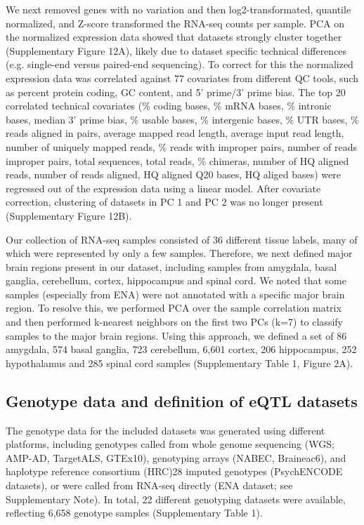 We next removed genes with no variation and then log2-transformated, quantile normalized, and Z-score transformed the RNA-seq counts per sample. PCA on the normalized expression data showed that datasets strongly cluster together (Supplementary Figure 12A), likely due to dataset specific technical differences (e.g. single-end versus paired-end sequencing). To correct for this the normalized expression data was correlated against 77 covariates from different QC tools, such as percent protein coding, GC content, and 5’ prime/3’ prime bias. The top 20 correlated technical covariates (\% coding bases, \% mRNA bases, \% intronic bases, median 3’ prime bias, \% usable bases, \% intergenic bases, \% UTR bases, \% reads aligned in pairs, average mapped read length, average input read length, number of uniquely mapped reads, \% reads with improper pairs, number of reads improper pairs, total sequences, total reads, \% chimeras, number of HQ aligned reads, number of reads aligned, HQ aligned Q20 bases, HQ aliged bases) were regressed out of the expression data using a linear model. After covariate correction, clustering of datasets in PC 1 and PC 2 was no longer present (Supplementary Figure 12B).  

Our collection of RNA-seq samples consisted of 36 different tissue labels, many of which were represented by only a few samples. Therefore, we next defined major brain regions present in our dataset, including samples from amygdala, basal ganglia, cerebellum, cortex, hippocampus and spinal cord. We noted that some samples (especially from ENA) were not annotated with a specific major brain region. To resolve this, we performed PCA over the sample correlation matrix and then performed k-nearest neighbors on the first two PCs (k=7) to classify samples to the major brain regions. Using this approach, we defined a set of 86 amygdala, 574 basal ganglia, 723 cerebellum, 6,601 cortex, 206 hippocampus, 252 hypothalamus and 285 spinal cord samples (Supplementary Table 1, Figure 2A). 



\subsection{Genotype data and definition of eQTL datasets }
The genotype data for the included datasets was generated using different platforms, including genotypes called from whole genome sequencing (WGS; AMP-AD, TargetALS, GTEx10), genotyping arrays (NABEC, Braineac6), and haplotype reference consortium (HRC)28 imputed genotypes (PsychENCODE datasets), or were called from RNA-seq directly (ENA dataset; see Supplementary Note). In total, 22 different genotyping datasets were available, reflecting 6,658 genotype samples (Supplementary Table 1).  

